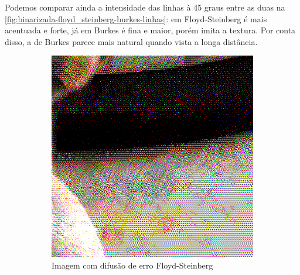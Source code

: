 \documentclass[brazilian,a4paper,twocolumn]{article}
\begin{document}
        Podemos comparar ainda a intensidade das linhas à 45 graus entre as duas na \cref{fig:binarizada-floyd_steinberg-burkes-linhas}: em Floyd-Steinberg é mais acentuada e forte, já em Burkes é fina e maior, porém imita a textura. Por conta disso, a de Burkes parece mais natural quando vista a longa distância.

        \begin{figure}
            \centering
            \begin{subfigure}{0.24\textwidth}
                \includegraphics[width=\textwidth,keepaspectratio]{../imgs/mel_binarizada-floyd_steinberg-detalhe1.png}
                \caption{Imagem com difusão de erro Floyd-Steinberg}
            \end{subfigure}
            \begin{subfigure}{0.24\textwidth}

\end{subfigure}
\end{figure}
\end{document}
